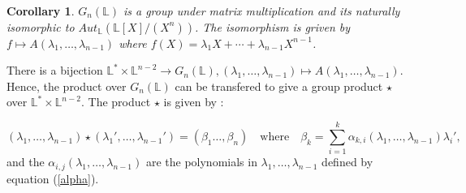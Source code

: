 \documentclass[12pt, reqno]{amsart}
\newtheorem{corollary}[theorem]{Corollary}
\newcommand{\FL}{ {\mathbb L} }
\begin{document}
\begin{corollary}\label{Gn}
$G_n(\FL)$ is a group under matrix multiplication and its naturally isomorphic to $Aut_\FL(\FL[X]/(X^n))$. The isomorphism is griven by $f\mapsto A(\lambda_1,\dots,\lambda_{n-1})$ where $f(X)=\lambda_1X+\cdots+ \lambda_{n-1} X^{n-1}$.
\end{corollary}

There is a bijection  $\FL^*\times \FL^{n-2}\to G_n(\FL), (\lambda_1,\dots,\lambda_{n-1})\mapsto A(\lambda_1,\dots,\lambda_{n-1})$. Hence, the product over $G_n(\FL)$ can be transfered to give a group product $\star  $ over $\FL^*\times \FL^{n-2}$. The product $\star$ is given by : 

$$ (\lambda_1,\dots,\lambda_{n-1}) \star (\lambda_1',\dots,\lambda_{n-1}')=(\beta_1\dots,\beta_n) \quad \text{where} \quad \beta_k=\overset{k}{\underset{i=1}{\sum}} \alpha_{k,i}(\lambda_1,\dots,\lambda_{n-1}) \lambda_i',$$
and the $\alpha_{i,j}(\lambda_1,\dots,\lambda_{n-1})$ are the polynomials in $\lambda_1,\dots,\lambda_{n-1}$ defined by equation (\ref{alpha}).
\end{document}
